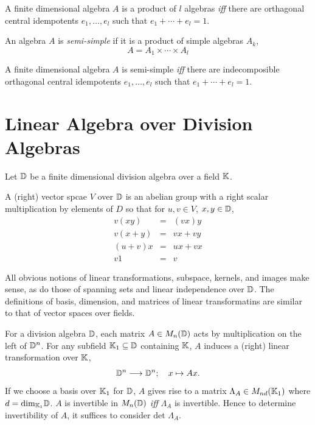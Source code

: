 \begin{proposition}
  A finite dimensional algebra \(A\) is a product of \(l\) algebras {\it iff} there are
  orthagonal central idempotents \(e_1,\dots,e_l\) such that \(e_1+\cdots+e_l=1\).
\end{proposition}

\begin{definition}
  An algebra \(A\) is {\it semi-simple} if it is a product of simple algebras \(A_k\),
  \[ A=A_1\times\cdots\times A_l \]
\end{definition}

\begin{proposition}
  A finite dimensional algebra \(A\) is semi-simple {\it iff} there are indecomposible orthagonal
  central idempotents \(e_1,\dots,e_l\) such that \(e_1+\cdots+e_l=1\).
\end{proposition}

\section{Linear Algebra over Division Algebras}
Let \(\mathbb{D}\) be a finite dimensional division algebra over a field \(\mathbb{K}\).

\begin{definition}
  A (right) vector spcae \(V\) over \(\mathbb{D}\) is an abelian group with a right scalar
  multiplication by elements of \(D\) so that for \(u,v\in V\), \(x,y\in\mathbb{D}\),
  \begin{eqnarray*}
    v(xy) &=& (vx)y \\
    v(x+y) &=& vx + vy \\
    (u+v)x &=& ux+vx \\
    v1 &=& v
  \end{eqnarray*}
\end{definition}

All obvious notions of linear transformations, subspace, kernels, and images make sense,
as do those of spanning sets and linear independence over \(\mathbb{D}\). The definitions of basis,
dimension, and matrices of linear transformatins are similar to that of vector spaces over
fields.

For a division algebra \(\mathbb{D}\), each matrix \(A\in M_n(\mathbb{D})\) acts by multiplication on the
left of \(\mathbb{D}^n\). For any subfield \(\mathbb{K}_1\subseteq\mathbb{D}\) containing \(\mathbb{K}\), \(A\) induces
a (right) linear transformation over \(\mathbb{K}\), 
\[ \D^n\longrightarrow\D^n;\hspace{10px} x\mapsto Ax. \]
If we choose a basis over \(\mathbb{K}_1\) for \(\mathbb{D}\), \(A\) gives rise to a matrix \(\Lambda_A\in M_{nd}(\mathbb{K}_1)\)
where \(d=\text{dim}_{\mathbb{K}_1}\mathbb{D}\). \(A\) is invertible in \(M_n(\mathbb{D})\) {\it iff} \(\Lambda_A\) is
invertible. Hence to determine invertibility of \(A\), it suffices to consider \(\text{det }\Lambda_A\).

